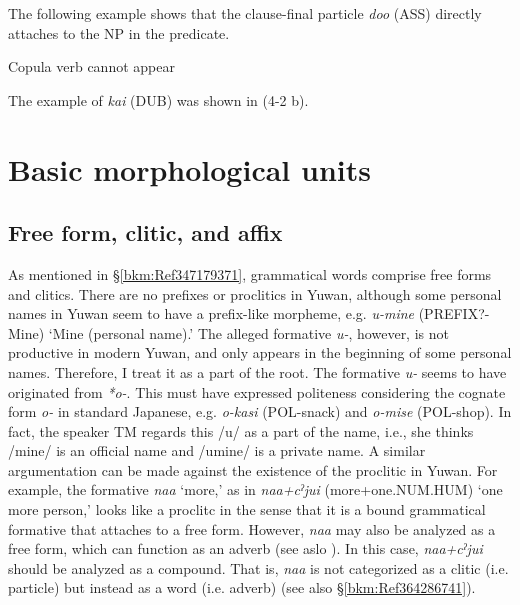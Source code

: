 \noindent The following example shows that the clause-final particle \textit{doo} (ASS) directly attaches to the NP in the predicate.

\ea\label{ex:4.19} Copula verb cannot appear
\ex{}\label{ex:4.19b}
\z
\z

\noindent The example of \textit{kai} (DUB) was shown in (4-2 b).

\section{Basic morphological units}\label{bkm:Ref381195916}\hypertarget{RefHeadingToc395696998}{}
\subsection{Free form, clitic, and affix}\label{bkm:Ref364029002}\hypertarget{RefHeadingToc395696999}{}
As mentioned in §\ref{bkm:Ref347179371}, grammatical words comprise free forms and clitics. There are no prefixes or proclitics in Yuwan, although some personal names in Yuwan seem to have a prefix-like morpheme, e.g. \textit{u{}-mine} (PREFIX?-Mine) ‘Mine (personal name).’ The alleged formative \textit{u-}, however, is not productive in modern Yuwan, and only appears in the beginning of some personal names. Therefore, I treat it as a part of the root. The formative \textit{u-} seems to have originated from \textit{*o-}. This must have expressed politeness considering the cognate form \textit{o-} in standard Japanese, e.g. \textit{o-kasi} (POL-snack) and \textit{o-mise} (POL-shop). In fact, the speaker TM regards this /u/ as a part of the name, i.e., she thinks /mine/ is an official name and /umine/ is a private name. A similar argumentation can be made against the existence of the proclitic in Yuwan. For example, the formative \textit{naa} ‘more,’ as in \textit{naa+cˀjui} (more+one.NUM.HUM) ‘one more person,’ looks like a proclitc in the sense that it is a bound grammatical formative that attaches to a free form. However, \textit{naa} may also be analyzed as a free form, which can function as an adverb (see aslo ). In this case, \textit{naa+cˀjui} should be analyzed as a compound. That is, \textit{naa} is not categorized as a clitic (i.e. particle) but instead as a word (i.e. adverb) (see also §\ref{bkm:Ref364286741}).

